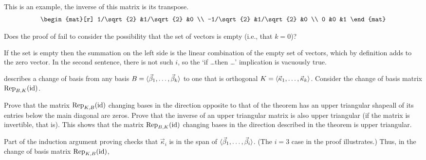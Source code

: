 \begin{exercises}
\begin{answer}
      This is an example, the inverse of this matrix is its transpose.
      \begin{equation*}
        \begin{mat}[r]
          1/\sqrt{2}  &1/\sqrt{2}  &0  \\
         -1/\sqrt{2}  &1/\sqrt{2}  &0  \\
          0           &0           &1
        \end{mat}
      \end{equation*}
    \end{answer}
  \item 
    Does the proof of  fail to consider the
    possibility that the set of vectors is empty (i.e., that $k=0$)?
    \begin{answer}
      If the set is empty then the summation on the left side is the
      linear combination of the empty set of vectors, 
      which by definition adds to the zero vector. 
      In the second sentence, there is not such $i$, so the 
      `if \ldots then \ldots' implication is vacuously true.
    \end{answer}
  \item 
     describes a change of basis 
    from any basis \( B=\langle\vec{\beta}_1,\ldots,\vec{\beta}_k\rangle \)
    to one that is orthogonal 
    \( K=\langle\vec{\kappa}_1,\ldots,\vec{\kappa}_k\rangle \).
    Consider the change of basis matrix ${\rm Rep}_{B,K}(\mbox{id})$. 
    \begin{exparts}
      \partsitem Prove that the matrix ${\rm Rep}_{K,B}(\mbox{id})$
        changing bases in the direction opposite to that of the theorem 
        has an upper triangular shape\Dash all
        of its entries below the main diagonal are zeros.
      \partsitem Prove that the inverse of an upper triangular matrix is 
        also upper triangular (if the matrix is invertible, that is).
        This shows that the matrix ${\rm Rep}_{B,K}(\mbox{id})$  changing bases 
        in the direction described in the theorem is upper triangular.
    \end{exparts}
    \begin{answer} 
      \begin{exparts}
        \partsitem Part of the induction argument proving 
           checks that 
          $\vec{\kappa}_i$ is in the span of 
          $\langle\vec{\beta}_1,\dots,\vec{\beta}_i\rangle$.
          (The $i=3$ case in the proof illustrates.)
          Thus, in the change of basis matrix ${\rm Rep}_{K,B}(\mbox{id})$, 

\end{exparts}
\end{answer}
\end{exercises}

